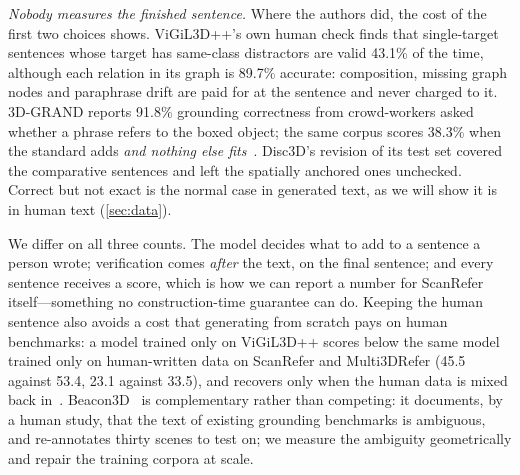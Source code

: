 \emph{Nobody measures the finished sentence.} Where the authors did, the cost of the first two choices shows. ViGiL3D++'s own human check finds that single-target sentences whose target has same-class distractors are valid 43.1\% of the time, although each relation in its graph is 89.7\% accurate: composition, missing graph nodes and paraphrase drift are paid for at the sentence and never charged to it. 3D-GRAND reports 91.8\% grounding correctness from crowd-workers asked whether a phrase refers to the boxed object; the same corpus scores 38.3\% when the standard adds \emph{and nothing else fits}~\cite{vigil3dpp}. Disc3D's revision of its test set covered the comparative sentences and left the spatially anchored ones unchecked. Correct but not exact is the normal case in generated text, as we will show it is in human text (\cref{sec:data}).

We differ on all three counts. The model decides what to add to a sentence a person wrote; verification comes \emph{after} the text, on the final sentence; and every sentence receives a score, which is how we can report a number for ScanRefer itself---something no construction-time guarantee can do. Keeping the human sentence also avoids a cost that generating from scratch pays on human benchmarks: a model trained only on ViGiL3D++ scores below the same model trained only on human-written data on ScanRefer and Multi3DRefer (45.5 against 53.4, 23.1 against 33.5), and recovers only when the human data is mixed back in~\cite{vigil3dpp}. Beacon3D~\cite{beacon3d} is complementary rather than competing: it documents, by a human study, that the text of existing grounding benchmarks is ambiguous, and re-annotates thirty scenes to test on; we measure the ambiguity geometrically and repair the training corpora at scale.

